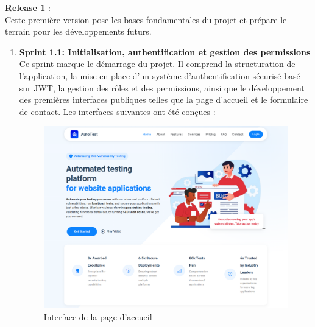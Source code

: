 \begin{justify}
    \textbf{\fontsize{16}{19}\selectfont   Release 1} :\\
            Cette première version pose les bases fondamentales du projet et prépare le terrain pour les développements futurs.  
            \begin{enumerate}[label=\Alph*.]
                \item \textbf{Sprint 1.1: Initialisation, authentification et gestion des permissions}  \\
                Ce sprint marque le démarrage du projet. Il comprend la structuration de l'application, la mise en place d’un système d’authentification sécurisé basé sur JWT, la gestion des rôles et des permissions, ainsi que le développement des premières interfaces publiques telles que la page d’accueil et le formulaire de contact. Les interfaces suivantes ont été conçues :
                \begin{figure}[H]
                    \centering
                    \includegraphics[width=\linewidth]{chapitres/ch3Sp1/section/sprint1/img/interface/acceuil-page.png}
                    \caption{Interface de la page d’accueil}
                    \label{fig:accueil}
                \end{figure}
                \begin{figure}[H]
                    \centering
                    \begin{minipage}[b]{0.495\linewidth}
                        \centering

\end{minipage}
\end{figure}
\end{enumerate}
\end{justify}
